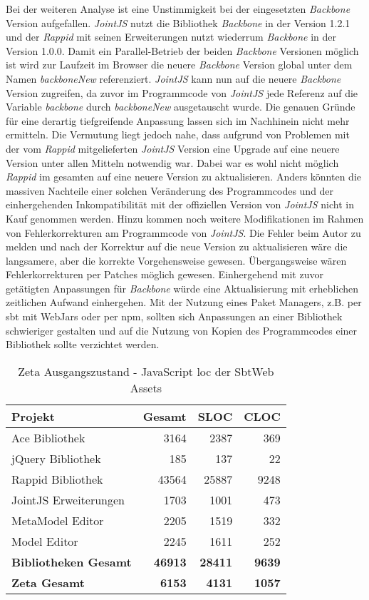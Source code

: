 Bei der weiteren Analyse ist eine Unstimmigkeit bei der eingesetzten \textit{Backbone} Version aufgefallen. \textit{JointJS} nutzt die Bibliothek \textit{Backbone} in der Version 1.2.1 und der \textit{Rappid} mit seinen Erweiterungen nutzt wiederrum \textit{Backbone} in der Version 1.0.0. Damit ein Parallel-Betrieb der beiden \textit{Backbone} Versionen möglich ist wird zur Laufzeit im Browser die neuere \textit{Backbone} Version global unter dem Namen \textit{backboneNew} referenziert. \textit{JointJS} kann nun auf die neuere \textit{Backbone} Version zugreifen, da zuvor im Programmcode von \textit{JointJS} jede Referenz auf die Variable \textit{backbone} durch \textit{backboneNew} ausgetauscht wurde. Die genauen Gründe für eine derartig tiefgreifende Anpassung lassen sich im Nachhinein nicht mehr ermitteln. Die Vermutung liegt jedoch nahe, dass aufgrund von Problemen mit der vom \textit{Rappid} mitgelieferten \textit{JointJS} Version eine Upgrade auf eine neuere Version unter allen Mitteln notwendig war. Dabei war es wohl nicht möglich \textit{Rappid} im gesamten auf eine neuere Version zu aktualisieren. Anders könnten die massiven Nachteile einer solchen Veränderung des Programmcodes und der einhergehenden Inkompatibilität mit der offiziellen Version von \textit{JointJS} nicht in Kauf genommen werden. Hinzu kommen noch weitere Modifikationen im Rahmen von Fehlerkorrekturen am Programmcode von \textit{JointJS}. Die Fehler beim Autor zu melden und nach der Korrektur auf die neue Version zu aktualisieren wäre die langsamere, aber die korrekte Vorgehensweise gewesen. Übergangsweise wären Fehlerkorrekturen per Patches möglich gewesen. Einhergehend mit zuvor getätigten Anpassungen für \textit{Backbone} würde eine Aktualisierung mit erheblichen zeitlichen Aufwand einhergehen. Mit der Nutzung eines Paket Managers, z.B. per \ac{sbt} mit WebJars oder per \ac{npm}, sollten sich Anpassungen an einer Bibliothek schwieriger gestalten und auf die Nutzung von Kopien des Programmcodes einer Bibliothek sollte verzichtet werden.

\begin{table}[ht]
    \smallskip
    \centering
    \begin{tabular}{| l | r | r | r |}
    \hline
    \bf Projekt & \bf Gesamt & \bf SLOC & \bf CLOC \\ \hline
    Ace Bibliothek & 3164 & 2387 & 369 \\ \hline
    jQuery Bibliothek & 185 & 137 & 22 \\ \hline
    Rappid Bibliothek & 43564 & 25887 & 9248 \\ \hline
    JointJS Erweiterungen & 1703 & 1001 & 473 \\ \hline
    MetaModel Editor & 2205 & 1519 & 332 \\ \hline
    Model Editor & 2245 & 1611 & 252 \\ \hline
    \bf Bibliotheken Gesamt & \bf 46913 & \bf 28411 & \bf 9639 \\ \hline
    \bf Zeta Gesamt & \bf 6153 & \bf 4131 & \bf 1057 \\ \hline
    \end{tabular}
    \caption{Zeta Ausgangszustand - JavaScript \ac{loc} der SbtWeb Assets}
    \label{tab:ZETA_WEB_ASSETS_LOC}
\end{table}

